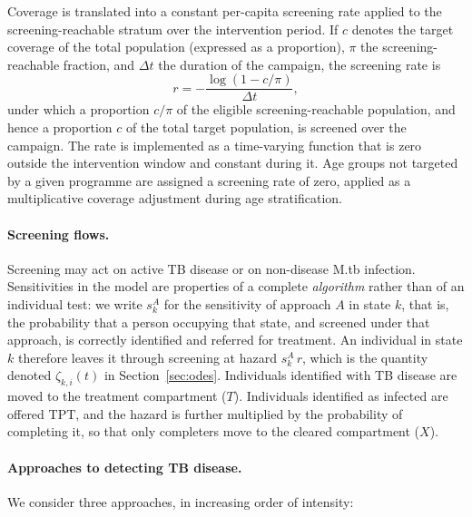 \documentclass[11pt]{article}
\begin{document}
Coverage is translated into a constant per-capita screening rate applied to the screening-reachable stratum over the intervention period. If \(c\) denotes the target coverage of the total population (expressed as a proportion), \(\pi\) the screening-reachable fraction, and \(\Delta t\) the duration of the campaign, the screening rate is
\[
r = -\frac{\log(1 - c/\pi)}{\Delta t},
\]
under which a proportion \(c/\pi\) of the eligible screening-reachable population, and hence a proportion \(c\) of the total target population, is screened over the campaign. The rate is implemented as a time-varying function that is zero outside the intervention window and constant during it. Age groups not targeted by a given programme are assigned a screening rate of zero, applied as a multiplicative coverage adjustment during age stratification.

\paragraph{Screening flows.}
Screening may act on active TB disease or on non-disease M.tb infection. Sensitivities in the model are properties of a complete \emph{algorithm} rather than of an individual test: we write \(s^{A}_k\) for the sensitivity of approach \(A\) in state \(k\), that is, the probability that a person occupying that state, and screened under that approach, is correctly identified and referred for treatment. An individual in state \(k\) therefore leaves it through screening at hazard \(s^{A}_k\, r\), which is the quantity denoted \(\zeta_{k,i}(t)\) in Section~\ref{sec:odes}. Individuals identified with TB disease are moved to the treatment compartment (\(T\)). Individuals identified as infected are offered TPT, and the hazard is further multiplied by the probability of completing it, so that only completers move to the cleared compartment (\(X\)).

\paragraph{Approaches to detecting TB disease.}
We consider three approaches, in increasing order of intensity:
\end{document}
